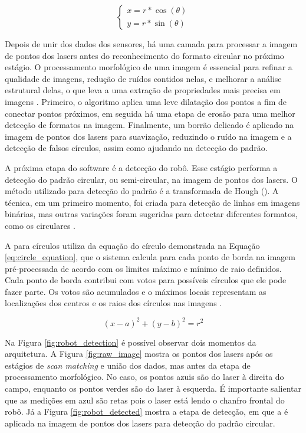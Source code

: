 \documentclass[acronym, symbols, table, deposito]{fei}
\begin{document}
				\begin{equation}\label{eq:map_coordinates}
					\begin{cases}
						x = r * \cos(\theta) \\
						y = r * \sin(\theta)
					\end{cases}
				\end{equation}
			
				Depois de unir dos dados dos sensores, há uma camada para processar a imagem de pontos dos lasers antes do reconhecimento do formato circular no próximo estágio. O processamento morfológico de uma imagem é essencial para refinar a qualidade de imagens, redução de ruídos contidos nelas, e melhorar a análise estrutural delas, o que leva a uma extração de propriedades mais precisa em imagens \cite{lotufo2023morphological}. Primeiro, o algoritmo aplica uma leve dilatação dos pontos a fim de conectar pontos próximos, em seguida há uma etapa de erosão para uma melhor detecção de formatos na imagem. Finalmente, um borrão delicado é aplicado na imagem de pontos dos lasers para suavização, reduzindo o ruído na imagem e a detecção de falsos círculos, assim como ajudando na detecção do padrão.
			
				A próxima etapa do software é a detecção do robô. Esse estágio performa a detecção do padrão circular, ou semi-circular, na imagem de pontos dos lasers. O método utilizado para detecção do padrão é a transformada de Hough (). A técnica, em um primeiro momento, foi criada para detecção de linhas em imagens binárias, mas outras variações foram sugeridas para detectar diferentes formatos, como os circulares \cite{mukhopadhyay2015survey}.
				
				A  para círculos utiliza da equação do círculo demonstrada na Equação \eqref{eq:circle_equation}, que o sistema calcula para cada ponto de borda na imagem pré-processada de acordo com os limites máximo e mínimo de raio definidos. Cada ponto de borda contribui com votos para possíveis círculos que ele pode fazer parte. Os votos são acumulados e o máximos locais representam as localizações dos centros e os raios dos círculos nas imagens \cite{hassanein2015survey}.
				
				\begin{equation}
					\label{eq:circle_equation}
					(x-a)^2 + (y-b)^2 = r^2
				\end{equation}
			
				Na Figura \ref{fig:robot_detection} é possível observar dois momentos da arquitetura. A Figura \ref{fig:raw_image} mostra os pontos dos lasers após os estágios de \textit{scan matching} e união dos dados, mas antes da etapa de processamento morfológico. No caso, os pontos azuis são do laser à direita do campo, enquanto os pontos verdes são do laser à esquerda. É importante salientar que as medições em azul são retas pois o laser está lendo o chanfro frontal do robô. Já a Figura \ref{fig:robot_detected} mostra a etapa de detecção, em que a  é aplicada na imagem de pontos dos lasers para detecção do padrão circular.
				
\end{document}
